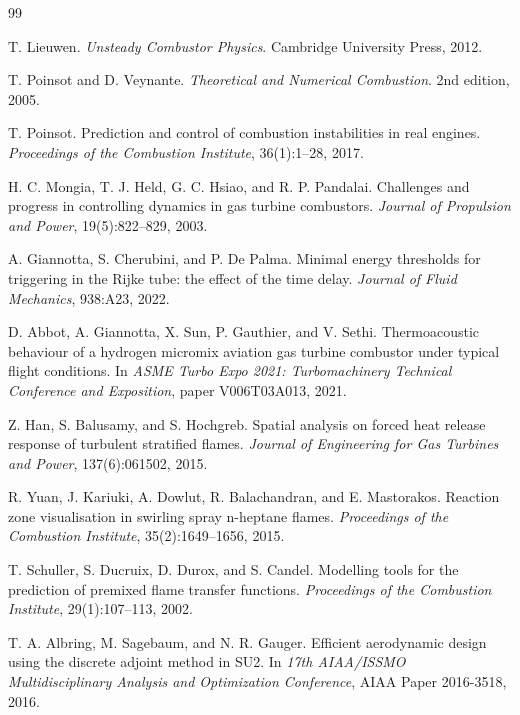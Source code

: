 \documentclass{iopconfser}
\begin{document}
\begin{thebibliography}{99}

\newblock T. Lieuwen.
\newblock \emph{Unsteady Combustor Physics}.
\newblock Cambridge University Press, 2012.

\newblock T. Poinsot and D. Veynante.
\newblock \emph{Theoretical and Numerical Combustion}.
\newblock 2nd edition, 2005.

\newblock T. Poinsot.
\newblock Prediction and control of combustion instabilities in real engines.
\newblock \emph{Proceedings of the Combustion Institute}, 36(1):1--28, 2017.

\newblock H. C. Mongia, T. J. Held, G. C. Hsiao, and R. P. Pandalai.
\newblock Challenges and progress in controlling dynamics in gas turbine combustors.
\newblock \emph{Journal of Propulsion and Power}, 19(5):822--829, 2003.

\newblock A. Giannotta, S. Cherubini, and P. De Palma.
\newblock Minimal energy thresholds for triggering in the Rijke tube: the effect of the time delay.
\newblock \emph{Journal of Fluid Mechanics}, 938:A23, 2022.

\newblock D. Abbot, A. Giannotta, X. Sun, P. Gauthier, and V. Sethi.
\newblock Thermoacoustic behaviour of a hydrogen micromix aviation gas turbine combustor under typical flight conditions.
\newblock In \emph{ASME Turbo Expo 2021: Turbomachinery Technical Conference and Exposition}, paper V006T03A013, 2021.

\newblock Z. Han, S. Balusamy, and S. Hochgreb.
\newblock Spatial analysis on forced heat release response of turbulent stratified flames.
\newblock \emph{Journal of Engineering for Gas Turbines and Power}, 137(6):061502, 2015.

\newblock R. Yuan, J. Kariuki, A. Dowlut, R. Balachandran, and E. Mastorakos.
\newblock Reaction zone visualisation in swirling spray n-heptane flames.
\newblock \emph{Proceedings of the Combustion Institute}, 35(2):1649--1656, 2015.

\newblock T. Schuller, S. Ducruix, D. Durox, and S. Candel.
\newblock Modelling tools for the prediction of premixed flame transfer functions.
\newblock \emph{Proceedings of the Combustion Institute}, 29(1):107--113, 2002.

\newblock T. A. Albring, M. Sagebaum, and N. R. Gauger.
\newblock Efficient aerodynamic design using the discrete adjoint method in SU2.
\newblock In \emph{17th AIAA/ISSMO Multidisciplinary Analysis and Optimization Conference}, AIAA Paper 2016-3518, 2016.


\end{thebibliography}
\end{document}
